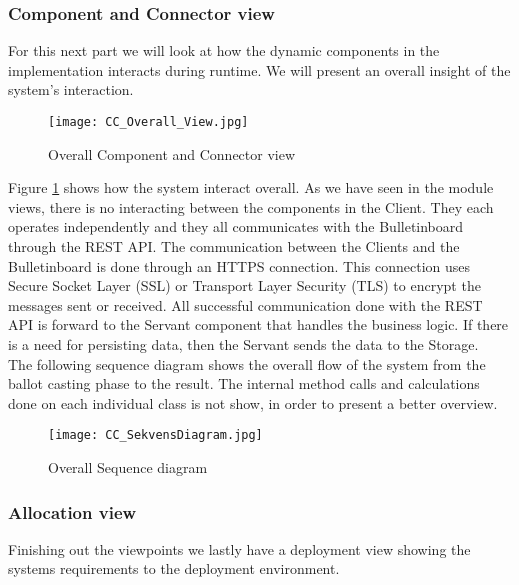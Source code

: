\subsubsection{Component and Connector view}
For this next part we will look at how the dynamic components in the implementation interacts during runtime. We will present an overall insight of the system's interaction. 

\begin{figure}[H]
    \centering
    \texttt{[image: CC\_Overall\_View.jpg]}
    \caption{Overall Component and Connector view}
    \label{fig:CC_overall_View}
\end{figure}

\noindent
Figure \ref{fig:CC_overall_View} shows how the system interact overall. As we have seen in the module views, there is no interacting between the components in the Client. They each operates independently and they all communicates with the Bulletinboard through the REST API.  The communication between the Clients and the Bulletinboard is done through an HTTPS connection. This connection uses Secure Socket Layer (SSL) or Transport Layer Security (TLS) to encrypt the messages sent or received. All successful communication done with the REST API is forward to the Servant component that handles the business logic. If there is a need for persisting data, then the Servant sends the data to the Storage. \\

\noindent
The following sequence diagram shows the overall flow of the system from the ballot casting phase to the result. The internal method calls and calculations done on each individual class is not show, in order to present a better overview.  

\begin{figure}[H]
    \centering
    \texttt{[image: CC\_SekvensDiagram.jpg]}
    \caption{Overall Sequence diagram}
    \label{fig:CC_sequence_diagram}   
\end{figure}

\subsubsection{Allocation view}
Finishing out the viewpoints we lastly have a deployment view showing the systems requirements to the deployment environment. 

